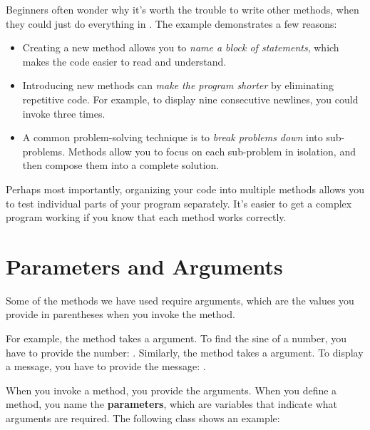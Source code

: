 Beginners often wonder why it's worth the trouble to write other methods, when they could just do everything in .
The  example demonstrates a few reasons:

\begin{itemize}

\item Creating a new method allows you to {\em name a block of statements}, which makes the code easier to read and understand.

\item Introducing new methods can {\em make the program shorter} by eliminating repetitive code.
For example, to display nine consecutive newlines, you could invoke  three times.

\item A common problem-solving technique is to {\em break problems down} into sub-problems.
Methods allow you to focus on each sub-problem in isolation, and then compose them into a complete solution.

\end{itemize}

Perhaps most importantly, organizing your code into multiple methods allows you to test individual parts of your program separately.
It's easier to get a complex program working if you know that each method works correctly.


\section{Parameters and Arguments}

Some of the methods we have used require arguments, which are the values you provide in parentheses when you invoke the method.

For example, the  method takes a  argument.
To find the sine of a number, you have to provide the number: .
Similarly, the  method takes a  argument.
To display a message, you have to provide the message: .


When you invoke a method, you provide the arguments.
When you define a method, you name the {\bf parameters}, which are variables that indicate what arguments are required.
The following class shows an example:

